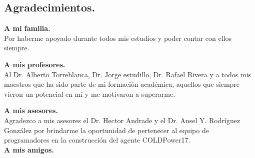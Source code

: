 \begin{center}
	\section*{Agradecimientos.}   
\end{center}
\setcounter{page}{1}

\textbf{A mi familia.}\\
Por haberme apoyado durante todos mis estudios y poder contar con ellos siempre.

\textbf{A mis profesores.}
\\
Al Dr. Alberto Torreblanca, Dr. Jorge estudillo, Dr. Rafael Rivera
y a todos mis maestros que ha sido parte de mi formación académica, aquellos que siempre vieron un potencial en mí y me motivaron a superarme.	

\textbf{A mis asesores.}\\
Agradezco a mis asesores el Dr. Hector Andrade y el Dr. Ansel Y. Rodríguez González por brindarme la oportunidad de pertenecer al equipo de programadores en la construcción del agente COLDPower17.
\\

\textbf{A mis amigos.}
